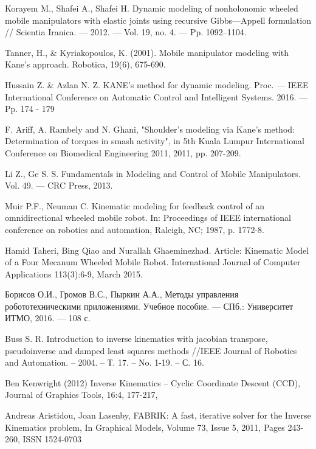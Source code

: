 \documentclass[14pt, a4paper]{extreport}
\begin{document}
\begin{thebibliography}{99}
{ Korayem M., Shafei A., Shafei H. Dynamic modeling of nonholonomic wheeled mobile manipulators with elastic joints using recursive Gibbs---Appell formulation // Scientia Iranica. — 2012. — Vol. 19, no. 4. — Pp. 1092–1104.

 Tanner, H., \& Kyriakopoulos, K. (2001). Mobile manipulator modeling with Kane's approach. Robotica, 19(6), 675-690.

 Hussain Z. \& Azlan N. Z. KANE's method for dynamic modeling. Proc. --- IEEE International Conference on Automatic Control and Intelligent Systems. 2016. --- Pp. 174 - 179 

 F. Ariff, A. Rambely and N. Ghani, "Shoulder’s modeling via Kane’s method: Determination of torques in smash activity", in 5th Kuala Lumpur International Conference on Biomedical Engineering 2011, 2011, pp. 207-209.

 Li Z., Ge S. S. Fundamentals in Modeling and Control of Mobile Manipulators. Vol. 49. —
CRC Press, 2013.

 Muir P.F., Neuman C. Kinematic modeling for feedback control of an omnidirectional wheeled mobile robot. In: Proceedings of IEEE international conference on robotics and automation, Raleigh, NC; 1987, p. 1772-8.

 Hamid Taheri, Bing Qiao and Nurallah Ghaeminezhad. Article: Kinematic Model of a Four Mecanum Wheeled Mobile Robot. International Journal of Computer Applications 113(3):6-9, March 2015.

 Борисов О.И., Громов В.С., Пыркин А.А., Методы управления робототехническими приложениями. Учебное пособие. — СПб.: Университет ИТМО, 2016. — 108 с.

 Buss S. R. Introduction to inverse kinematics with jacobian transpose, pseudoinverse and damped least squares methods //IEEE Journal of Robotics and Automation. – 2004. – Т. 17. – No. 1-19. – С. 16.

 Ben Kenwright (2012) Inverse Kinematics – Cyclic Coordinate Descent (CCD),
Journal of Graphics Tools, 16:4, 177-217,

 Andreas Aristidou, Joan Lasenby, FABRIK: A fast, iterative solver for the Inverse Kinematics problem, In Graphical Models, Volume 73, Issue 5, 2011, Pages 243-260, ISSN 1524-0703

}

\end{thebibliography}
\end{document}
